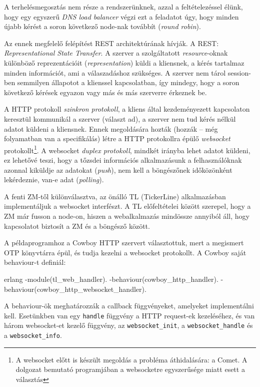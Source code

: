 \documentclass[12pt, a4paper, oneside]{book}
\begin{document}
A terhelésmegosztás nem része a rendszerünknek, azzal a feltételezéssel élünk,
hogy egy egyszerű \emph{DNS load balancer} végzi ezt a feladatot úgy, hogy
minden újabb kérést a soron következő node-nak továbbít (\emph{round robin}). 

Az ennek megfelelő felépítést REST architektúrának hívják. A REST:
\emph{Representational State Transfer}. A szerver a szolgáltatott
\emph{resource}-oknak különböző reprezentációit (\emph{representation})
küldi a kliensnek, a kérés tartalmaz minden információt, ami a válaszadáshoz
szükséges. A szerver nem tárol session-ben semmilyen állapotot a klienssel
kapcsolatban, így mindegy, hogy a soron következő kérések egyazon vagy más és
más szerverre érkeznek be.

A HTTP protokoll \emph{szinkron protokoll}, a kliens által kezdeményezett
kapcsolaton keresztül kommunikál a szerver (választ ad), a szerver nem tud
kérés nélkül adatot küldeni a kliensnek. Ennek megoldására hozták (hozzák --
még folyamatban van a specifikálás) létre a HTTP protokollra épülő
\emph{websocket} protokollt\footnote{A websocket előtt is készült megoldás a
probléma áthidalására: a Comet. A dolgozat bemutató programjában a websocketre
egyszerűsége miatt esett a választás}.  A websocket \emph{duplex protokoll},
mindkét irányba lehet adatot küldeni, ez lehetővé teszi, hogy a tőzsdei
információs alkalmazásunk a felhasználóknak azonnal kiküldje az adatokat
(\emph{push}), nem kell a böngészőnek időközönként lekérdeznie, van-e adat
(\emph{polling}).

A fenti ZM-től különválasztva, az önálló TL (TickerLine) alkalmazásban 
implementáljuk a websocket interfészt. A TL előfeltételei között szerepel, hogy
a ZM már fusson a node-on, hiszen a webalkalmazás mindössze annyiból áll, hogy
kapcsolatot biztosít a ZM és a böngésző között.

A példaprogramhoz a Cowboy HTTP szervert választottuk, mert a megismert OTP
könyvtárra épül, és tudja kezelni a websocket protokollt. A Cowboy saját
behaviour-t definiál: 

\begin{code}{erlang}{}
-module(tl_web_handler).
-behaviour(cowboy_http_handler).
-behaviour(cowboy_http_websocket_handler).
\end{code}

A behaviour-ök meghatározzák a callback függvényeket, amelyeket implementálni
kell. Esetünkben van egy \texttt{handle} függvény a HTTP request-ek
kezeléséhez, és van három websocket-et kezelő függvény, az
\texttt{websocket\_init}, a \texttt{websocket\_handle} és a
\texttt{websocket\_info}.
\end{document}
